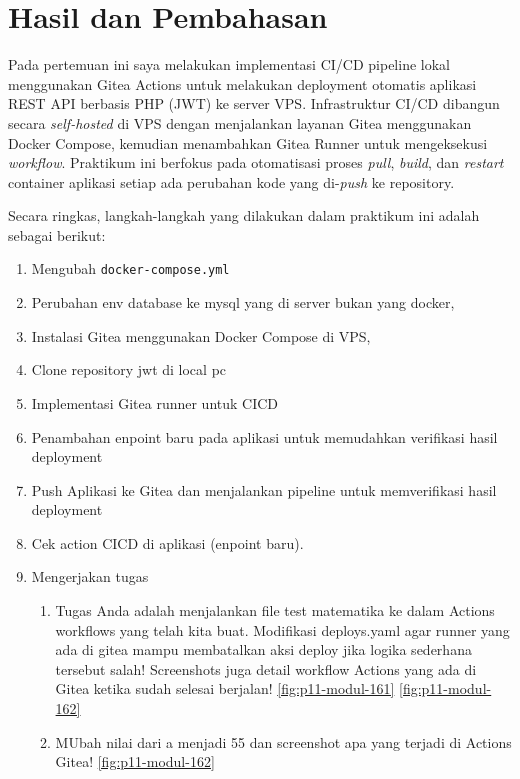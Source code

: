 \documentclass[a4paper,oneside,11pt]{book}
\begin{document}

\section{Hasil dan Pembahasan}

\par Pada pertemuan ini saya melakukan implementasi CI/CD pipeline lokal menggunakan Gitea Actions untuk melakukan deployment otomatis aplikasi REST API berbasis PHP (JWT) ke server VPS. Infrastruktur CI/CD dibangun secara \textit{self-hosted} di VPS dengan menjalankan layanan Gitea menggunakan Docker Compose, kemudian menambahkan Gitea Runner untuk mengeksekusi \textit{workflow}. Praktikum ini berfokus pada otomatisasi proses \textit{pull}, \textit{build}, dan \textit{restart} container aplikasi setiap ada perubahan kode yang di-\textit{push} ke repository.

\par Secara ringkas, langkah-langkah yang dilakukan dalam praktikum ini adalah sebagai berikut:
\begin{enumerate}
  \item Mengubah \texttt{docker-compose.yml} 
  \item Perubahan env database ke mysql yang di server bukan yang docker,
  \item Instalasi Gitea menggunakan Docker Compose di VPS,
  \item Clone repository jwt di local pc
  \item Implementasi Gitea runner untuk CICD
  \item Penambahan enpoint baru pada aplikasi untuk memudahkan verifikasi hasil deployment
  \item Push Aplikasi ke Gitea dan menjalankan pipeline untuk memverifikasi hasil deployment
  \item Cek action CICD di aplikasi (enpoint baru).
  \item Mengerjakan tugas 
    \begin{enumerate}
      \item Tugas Anda adalah menjalankan file test matematika ke dalam Actions workflows yang telah kita buat. Modifikasi deploys.yaml agar runner yang ada di gitea mampu membatalkan aksi deploy jika logika sederhana tersebut salah! Screenshots juga detail workflow Actions yang ada di Gitea ketika sudah selesai berjalan! \ref{fig:p11-modul-161} \ref{fig:p11-modul-162}
      \item MUbah nilai dari a menjadi 55 dan screenshot apa yang terjadi di Actions Gitea! \ref{fig:p11-modul-162}
    \end{enumerate}
\end{enumerate}
\end{document}
